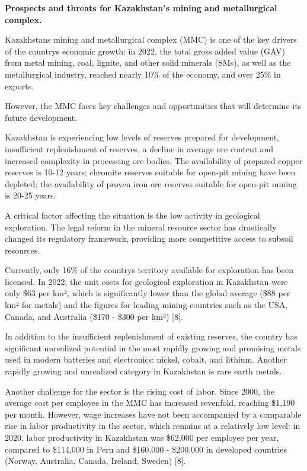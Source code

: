 {\bfseries Prospects and threats for Kazakhstan's mining and metallurgical
complex.}

Kazakhstan\textquotesingle s mining and metallurgical complex (MMC) is
one of the key drivers of the country\textquotesingle s economic growth:
in 2022, the total gross added value (GAV) from metal mining, coal,
lignite, and other solid minerals (SMs), as well as the metallurgical
industry, reached nearly 10\% of the economy, and over 25\% in exports.

However, the MMC faces key challenges and opportunities that will
determine its future development.

Kazakhstan is experiencing low levels of reserves prepared for
development, insufficient replenishment of reserves, a decline in
average ore content and increased complexity in processing ore bodies.
The availability of prepared copper reserves is 10-12 years; chromite
reserves suitable for open-pit mining have been depleted; the
availability of proven iron ore reserves suitable for open-pit mining is
20-25 years.

A critical factor affecting the situation is the low activity in
geological exploration. The legal reform in the mineral resource sector
has drastically changed its regulatory framework, providing more
competitive access to subsoil resources.

Currently, only 16\% of the country\textquotesingle s territory
available for exploration has been licensed. In 2022, the unit costs for
geological exploration in Kazakhstan were only \$63 per km², which is
significantly lower than the global average (\$88 per km² for metals)
and the figures for leading mining countries such as the USA, Canada,
and Australia (\$170 - \$300 per km²) {[}8{]}.

In addition to the insufficient replenishment of existing reserves, the
country has significant unrealized potential in the most rapidly growing
and promising metals used in modern batteries and electronics: nickel,
cobalt, and lithium. Another rapidly growing and unrealized category in
Kazakhstan is rare earth metals.

Another challenge for the sector is the rising cost of labor. Since
2000, the average cost per employee in the MMC has increased sevenfold,
reaching \$1,190 per month. However, wage increases have not been
accompanied by a comparable rise in labor productivity in the sector,
which remains at a relatively low level: in 2020, labor productivity in
Kazakhstan was \$62,000 per employee per year, compared to \$114,000 in
Peru and \$160,000 - \$200,000 in developed countries (Norway,
Australia, Canada, Ireland, Sweden) {[}8{]}.

